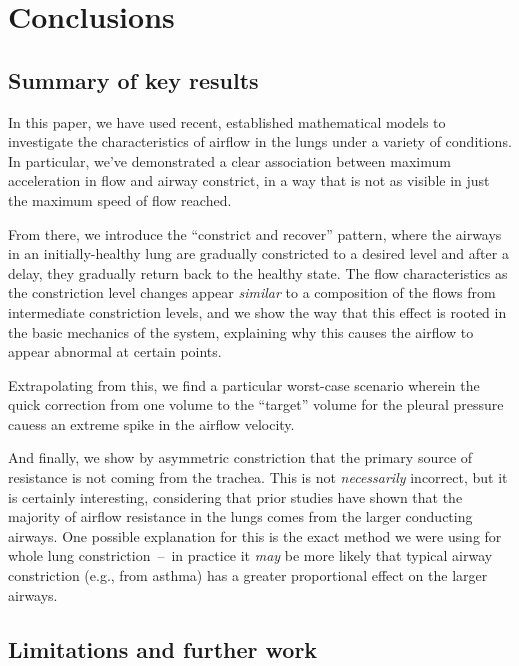 %
\section{Conclusions}

\subsection{Summary of key results} \label{sec:summary-of-key-results}

In this paper, we have used recent, established mathematical models to investigate the
characteristics of airflow in the lungs under a variety of conditions. In particular, we've
demonstrated a clear association between maximum acceleration in flow and airway constrict, in a
way that is not as visible in just the maximum speed of flow reached.

From there, we introduce the ``constrict and recover'' pattern, where the airways in an
initially-healthy lung are gradually constricted to a desired level and after a delay, they
gradually return back to the healthy state. The flow characteristics as the constriction level
changes appear \textit{similar} to a composition of the flows from intermediate constriction levels,
and we show the way that this effect is rooted in the basic mechanics of the system, explaining why
this causes the airflow to appear abnormal at certain points.

Extrapolating from this, we find a particular worst-case scenario wherein the quick correction from
one volume to the ``target'' volume for the pleural pressure cauess an extreme spike in the airflow
velocity.

And finally, we show by asymmetric constriction that the primary source of resistance is not coming
from the trachea. This is not \textit{necessarily} incorrect, but it is certainly interesting,
considering that prior studies have shown that the majority of airflow resistance in the lungs comes
from the larger conducting airways. One possible explanation for this is the exact method we were
using for whole lung constriction~--~in practice it \textit{may} be more likely that typical airway
constriction (e.g., from asthma) has a greater proportional effect on the larger airways.

\subsection{Limitations and further work} \label{sec:limitations-and-further-work}


